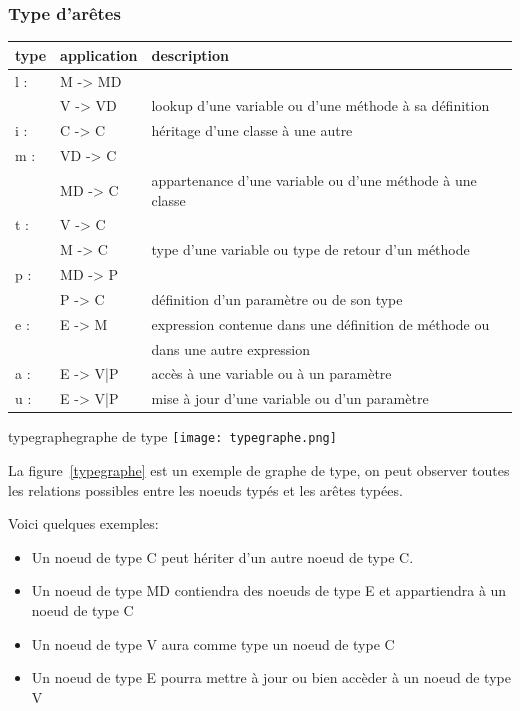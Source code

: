 \documentclass[a4paper, 12pt]{article}
\begin{document}
  \subsubsection{Type d'arêtes}
  \begin{tabular}{ | l | l |  l |}
    \hline type & application & description  \\ \hline
    l : & M -> MD & \\ & V -> VD & lookup d'une variable ou d'une méthode à sa définition \\ \hline
    i : & C -> C &  héritage d'une classe à une autre  \\ \hline
    m : & VD -> C & \\ & MD -> C & appartenance d'une variable ou d'une méthode à une classe  \\ \hline
    t : & V -> C  & \\ &  M -> C & type d'une variable ou type de retour d'un méthode   \\ \hline
    p : & MD -> P  & \\ &  P -> C & définition d'un paramètre ou de son type     \\ \hline
    e : & E -> M & expression contenue dans une définition de méthode ou \\ & &  dans une autre expression    \\ \hline
    a : & E -> {V|P} & accès à une variable ou à un paramètre    \\ \hline
    u : & E -> {V|P} & mise à jour d'une variable ou d'un paramètre    \\ \hline
  \end{tabular}

  \begin{myfig}{typegraphe}{graphe de type}
    \texttt{[image: typegraphe.png]}
  \end{myfig}

  La figure~\ref{typegraphe} est un exemple de graphe de type, on peut observer toutes les relations possibles entre les noeuds typés et les arêtes typées.

  Voici quelques exemples:
  \begin{itemize}[label=\textbullet]
    \item Un noeud de type C peut hériter d'un autre noeud de type C.
    \item Un noeud de type MD contiendra des noeuds de type E et appartiendra à un noeud de type C
    \item Un noeud de type V aura comme type un noeud de type C
    \item Un noeud de type E pourra mettre à jour ou bien accèder à un noeud de type V
  \end{itemize}
\end{document}
